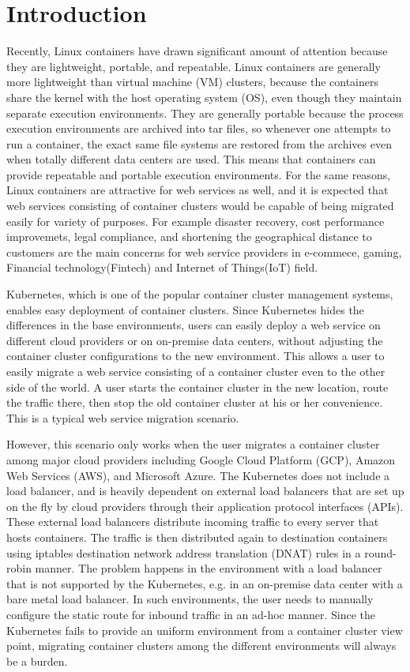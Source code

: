 \section{Introduction}

Recently, Linux containers have drawn significant amount of attention because they are lightweight, portable, and repeatable.
Linux containers are generally more lightweight than virtual machine (VM) clusters, 
because the containers share the kernel with the host operating system (OS), even though they maintain separate execution environments. 
They are generally portable because the process execution environments are archived into tar files, 
so whenever one attempts to run a container, the exact same file systems are restored from the archives 
even when totally different data centers are used. 
This means that containers can provide repeatable and portable execution environments.
%
For the same reasons, Linux containers are attractive for web services as well, 
and it is expected that web services consisting of container clusters would be 
capable of being migrated easily for variety of purposes. For example disaster recovery, 
cost performance improvemets, legal compliance, and shortening the geographical distance to customers 
are the main concerns for web service providers in e-commece, gaming, Financial technology(Fintech) and Internet of Things(IoT) field.
%

Kubernetes\cite{K8s2017}, which is one of the popular container cluster management systems, 
enables easy deployment of container clusters.
Since Kubernetes hides the differences in the base environments, users can easily deploy a web service on different 
cloud providers or on on-premise data centers, without adjusting the container cluster configurations to the new environment. 
This allows a user to easily migrate a web service consisting of a container cluster even to the other side of the world. 
A user starts the container cluster in the new location, route the traffic there, 
then stop the old container cluster at his or her convenience.
This is a typical web service migration scenario.

However, this scenario only works when the user migrates a container cluster among major cloud providers including Google Cloud Platform (GCP), 
Amazon Web Services (AWS), and Microsoft Azure.
The Kubernetes does not include a load balancer, and is heavily dependent on external load balancers that are set up on the fly 
by cloud providers through their application protocol interfaces (APIs). 
These external load balancers distribute incoming traffic to every server that hosts containers.
The traffic is then distributed again to destination containers using iptables destination 
network address translation (DNAT)\cite{MartinA.Brown2017,Marmol2015} rules in a round-robin manner. 
The problem happens in the environment with a load balancer that is not supported by the Kubernetes, 
e.g. in an on-premise data center with a bare metal load balancer. 
In such environments, the user needs to manually configure 
the static route for inbound traffic in an ad-hoc manner. 
Since the Kubernetes fails to provide an uniform environment from a container cluster view point,
migrating container clusters among the different environments will always be a burden.

